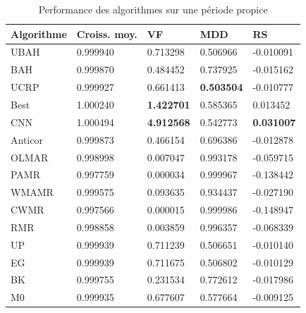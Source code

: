 \documentclass[a4paper, 10pt]{article}
\begin{document}
\begin{center}
\begin{table}[!ht]
\begin{tabularx}{\textwidth}{YYYYY}
\toprule
\textbf{Algorithme} & \textbf{Croiss. moy.} & \textbf{VF} & \textbf{MDD} & \textbf{RS}\\
\midrule
UBAH    & 0.999940 & 0.713298 & 0.506966 & -0.010091 \\
BAH     & 0.999870 & 0.484452 & 0.737925 & -0.015162 \\
UCRP    & 0.999927 & 0.661413 & \textbf{0.503504} & -0.010777 \\
Best    & 1.000240 & \textbf{1.422701} & 0.585365 &  0.013452 \\
CNN     & 1.000494 & \textbf{4.912568} & 0.542773 &  \textbf{0.031007} \\
Anticor & 0.999873 & 0.466154 & 0.696386 & -0.012878 \\
OLMAR   & 0.998998 & 0.007047 & 0.993178 & -0.059715 \\
PAMR    & 0.997759 & 0.000034 & 0.999967 & -0.138442 \\
WMAMR   & 0.999575 & 0.093635 & 0.934437 & -0.027190 \\
CWMR    & 0.997566 & 0.000015 & 0.999986 & -0.148947 \\
RMR     & 0.998858 & 0.003859 & 0.996357 & -0.068339 \\
UP      & 0.999939 & 0.711239 & 0.506651 & -0.010140 \\
EG      & 0.999939 & 0.711675 & 0.506802 & -0.010129 \\
BK      & 0.999755 & 0.231534 & 0.772612 & -0.017986 \\
M0      & 0.999935 & 0.677607 & 0.577664 & -0.009125 \\
\bottomrule
\end{tabularx}
\caption{Performance des algorithmes sur une période propice}
\label{tab:perf_high}
\end{table}
\end{center}
\end{document}
